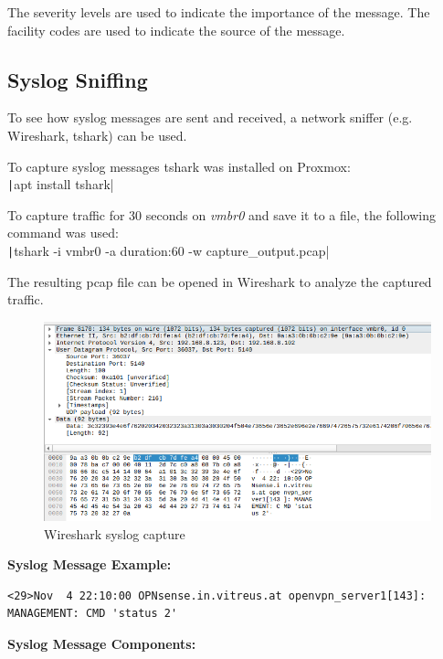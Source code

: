 The severity levels are used to indicate the importance of the message. The facility codes are used to indicate the source of the message.

\subsection{Syslog Sniffing}

To see how syslog messages are sent and received, a network sniffer (e.g. Wireshark, tshark) can be used. 

To capture syslog messages tshark was installed on Proxmox:\\
\texttt|apt install tshark|

To capture traffic for 30 seconds on \textit{vmbr0} and save it to a file, the following command was used:\\
\texttt|tshark -i vmbr0 -a duration:60 -w capture_output.pcap|

The resulting pcap file can be opened in Wireshark to analyze the captured traffic.

\begin{figure}[H]
	\centering
	\includegraphics[width=1\linewidth]{Figures/wireshark-syslog.png}
	\caption{Wireshark syslog capture}
\end{figure}

\textbf{Syslog Message Example:}
\begin{verbatim}
<29>Nov  4 22:10:00 OPNsense.in.vitreus.at openvpn_server1[143]: MANAGEMENT: CMD 'status 2'
\end{verbatim}

\bigskip
\noindent
\textbf{Syslog Message Components:}

